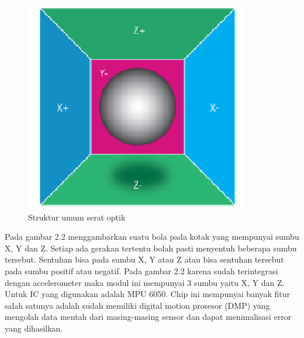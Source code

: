 \documentclass[11pt]{article}
\begin{document}
\begin{figure}[!h]
	\centering
	\captionsetup{justification=centering}
	\includegraphics[width=0.7\linewidth]{dokumentasi/MPU6050/contoh.png}
	\caption[Struktur Serat]{\small{Struktur umum serat optik}}
\end{figure}
Pada gambar 2.2 menggambarkan suatu bola pada kotak yang mempunyai sumbu X, Y dan Z. 
Setiap ada gerakan tertentu bolah pasti menyentuh beberapa sumbu tersebut.
Sentuhan bisa pada sumbu X, Y atau Z atau bisa sentuhan tersebut pada sumbu positif atau negatif.
Pada gambar 2.2 karena sudah terintegrasi dengan accelerometer maka modul ini mempunyai 3 sumbu yaitu X, Y dan Z.
Untuk IC yang digunakan adalah MPU 6050.
Chip ini mempunyai banyak fitur salah satunya adalah sudah memiliki digital motion prosesor (DMP) yang mengolah data mentah dari masing-masing sensor dan dapat menimalisasi error yang dihasilkan.
\end{document}
